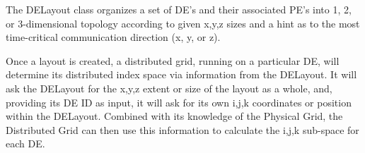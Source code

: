 
The DELayout class organizes a set of DE's and their associated PE's into
1, 2, or 3-dimensional topology according to given x,y,z sizes and a hint
as to the most time-critical communication direction (x, y, or z).

Once a layout is created, a distributed grid, running on a particular DE,
will determine its distributed index space via information from the DELayout.
It will ask the DELayout for the x,y,z extent or size of the layout as a whole,
and, providing its DE ID as input, it will ask for its own i,j,k coordinates
or position within the DELayout.  Combined with its knowledge of the Physical
Grid, the Distributed Grid can then use this information to calculate the
i,j,k sub-space for each DE.
